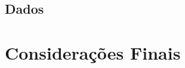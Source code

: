\documentclass[12pt,oneside,a4paper,chapter=TITLE,english,brazil,sumario=abnt-6027-2012]{abntex2}
\begin{document}
\section{Dados}

\chapter{Considerações Finais}










\end{document}
